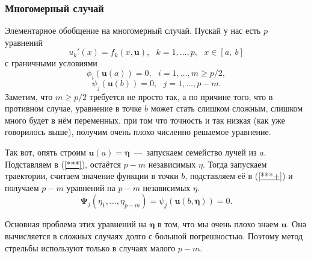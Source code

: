 \documentclass[a4paper,9pt,russian]{article}
\begin{document}
\subsubsection{Многомерный случай}
    Элементарное обобщение на многомерный случай. Пускай у нас есть $p$ уравнений
    \begin{equation}
     u_k'(x) = f_k(x, \boldsymbol u),\ \ \ k=1, \ldots,p,\ \ \ x \in [a,\ b]
    \end{equation}
    с граничными условиями
    \begin{equation}\label{***}
     \phi_i (\boldsymbol u(a)) = 0,\ \ \ i=1, \ldots,m \ge p/2,
    \end{equation}
    \begin{equation}\label{***+}
     \psi_j (\boldsymbol u(b)) = 0,\ \ \ j=1, \ldots,p-m.
    \end{equation}
    Заметим, что $m \ge p/2$ требуется не просто так, а по причине того, что в противном случае, уравнение в точке $b$ может стать слишком сложным, слишком много будет в нём переменных, при том что точность и так низкая (как уже говорилось выше), получим очень плохо численно решаемое уравнение.\par
    Так вот, опять строим $\boldsymbol u(a)=\boldsymbol \eta$~---~запускаем семейство лучей из $a$. Подставляем в (\ref{***}), остаётся $p-m$ независимых $\eta$. Тогда запускаем траектории, считаем значение функции в точки $b$, подставляем её в (\ref{***+}) и получаем $p-m$ уравнений на $p-m$ независимых $\eta$.
    \begin{equation}
     \boldsymbol \Psi_j(\eta_1,\ldots, \eta_{p-m})= \psi_j (\boldsymbol u(b, \boldsymbol \eta)) = 0.
    \end{equation}
    \par
    Основная проблема этих уравнений на $\boldsymbol \eta$ в том, что мы очень плохо знаем $\boldsymbol u$. Она вычисляется в сложных случаях долго с большой погрешностью. Поэтому метод стрельбы используют только в случаях малого $p-m$.
\end{document}
